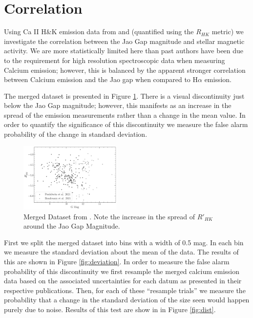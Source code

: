\section{Correlation}\label{sec:results}
Using Ca II H\&K emission data from \citet{Boudreaux2022} and
\citet{Perdelwitz2021} (quantified using the $R_{HK}$ metric) we investigate
the correlation between the Jao Gap magnitude and stellar magnetic activity. We
are more statistically limited here than past authors have been due to
the requirement for high resolution spectroscopic data when measuring Calcium
emission; however, this is balanced by the apparent stronger correlation between
Calcium emission and the Jao gap when compared to H$\alpha$ emission. 

The merged dataset is presented in Figure \ref{fig:mergedData}. There is a
visual discontinuity just below the Jao Gap magnitude; however, this
manifests as an increase in the spread of the emission measurements rather than
a change in the mean value. In order to quantify the significance of this
discontinuity we measure the false alarm probability of the change in standard
deviation.

\begin{figure}
  \centering
  \includegraphics[width=0.45\textwidth]{figures/jaoMagActivity/Combined.pdf}
  \caption{Merged Dataset from \citet{Boudreaux2022, Perdelwitz2021}. Note the
  increase in the spread of $R'_{HK}$ around the Jao Gap Magnitude.}
  \label{fig:mergedData}
\end{figure}

First we split the merged dataset into bins with a width of 0.5 mag. In each bin we
measure the standard deviation about the mean of the data. The results of this
are shown in Figure \ref{fig:deviation}. In order to measure the false alarm
probability of this discontinuity we first resample the merged calcium
emission data based on the associated uncertainties for each datum as
presented in their respective publications. Then, for each of these ``resample
trials'' we measure the probability that a change in the standard deviation of
the size seen would happen purely due to noise. Results of this test are show in
in Figure \ref{fig:dist}. 

